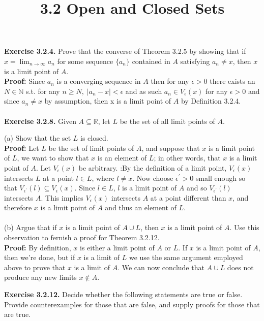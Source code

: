 \documentclass{article}
\title{\textbf{3.2 Open and Closed Sets}}
\begin{document}
	\maketitle
	\textbf{Exercise 3.2.4.} Prove that the converse of Theorem 3.2.5 by showing that if $x = \lim_{n \to \infty}a_n$ for some sequence $\{ a_n \}$ contained in $A$ satisfying $a_n \neq x$, then $x$ is a limit point of $A$.  \\
	\textbf{Proof:} Since $a_n$ is a converging sequence in $A$ then for any $\epsilon > 0$ there exists an $N \in \mathbb{N}$ s.t. for any $n \geq N, \; |a_n - x| < \epsilon$ and as such $a_n \in V_\epsilon(x)$ for any $\epsilon > 0$ and since $a_n \neq x$ by assumption, then x is a limit point of $A$ by Definition 3.2.4. \\ \\
	\textbf{Exercise 3.2.8.} Given $A \subseteq \mathbb{R}$, let $L$ be the set of all limit points of $A$.
	\begin{itemize}
		(a) Show that the set $L$ is closed. \\
		\textbf{Proof:} Let $L$ be the set of limit points of $A$, and suppose that $x$ is a limit point of $L$, we want to show that $x$ is an element of $L$; in other words, that $x$ is a limit point of $A$. Let $V_\epsilon(x)$ be arbitrary. :By the definition of a limit point, $V_\epsilon(x)$ intersects $L$ at a point $l \in L$, where $l \neq x$. Now choose $\epsilon^{'} > 0$ small enough so that $V_{\epsilon^{'}}(l) \subseteq V_\epsilon(x)$. Since $l \in L$, $l$ is a limit point of $A$ and so $V_{\epsilon^{'}}(l)$ intersects $A$. This implies $V_\epsilon(x)$ intersects $A$ at a point different than $x$, and therefore $x$ is a limit point of $A$ and thus an element of $L$.\\ \\
		(b) Argue that if $x$ is a limit point of $A \cup L$, then $x$ is a limit point of $A$. Use this observation to fernish a proof for Theorem 3.2.12. \\
		\textbf{Proof:} By definition, $x$ is either a limit point of $A$ or $L$. If $x$ is a limit point of $A$, then we're done, but if $x$ is a limit of $L$ we use the same argument employed above to prove that $x$ is a limit of $A$. We can now conclude that $A \cup L$ does not produce any new limits $x \notin A$. \\
	\end{itemize}
	\textbf{Exercise 3.2.12.} Decide whether the following statements are true or false. \\
	Provide counterexamples for those that are false, and supply proofs for those that are true. \\
\end{document}
